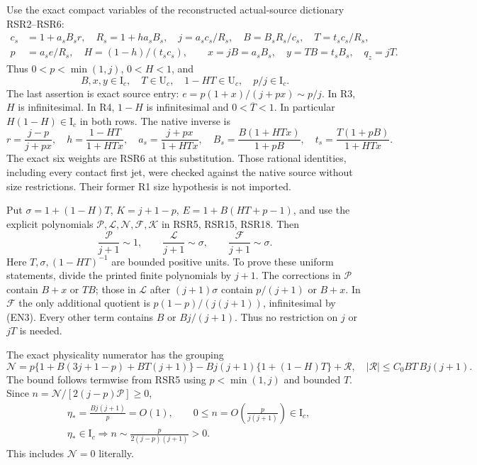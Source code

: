 Use the exact compact variables of the reconstructed actual-source
dictionary RSR2--RSR6:
\[
\begin{aligned}
c_s&=1+a_sB_sr,\quad R_s=1+ha_sB_s,\quad
j=a_sc_s/R_s,\quad B=B_sR_s/c_s,\quad T=t_sc_s/R_s,\\
p&=a_s e/R_s,\quad H=(1-h)/(t_sc_s),\qquad
x=jB=a_sB_s,\quad y=TB=t_sB_s,\quad q_z=jT .
\end{aligned}                                                    \tag{EN2}
\]
Thus $0<p<\min(1,j)$, $0<H<1$, and
\[
B,x,y\in\mathrm I_c,\quad T\in\mathrm U_c,\quad
1-HT\in\mathrm U_c,\quad p/j\in\mathrm I_c.              \tag{EN3}
\]
The last assertion is exact source entry:
$e=p(1+x)/(j+px)\sim p/j$.
In R3, $H$ is infinitesimal. In R4, $1-H$ is infinitesimal
and $0<\overline T<1$. In particular
$H(1-H)\in\mathrm I_c$ in both rows.
The native inverse is
\[
r=\frac{j-p}{j+px},\quad h=\frac{1-HT}{1+HTx},\quad
a_s=\frac{j+px}{1+HTx},\quad
B_s=\frac{B(1+HTx)}{1+pB},\quad
t_s=\frac{T(1+pB)}{1+HTx}.                              \tag{EN4}
\]
The exact six weights are RSR6 at this substitution.
Those rational identities, including every contact first jet, were
checked against the native source without size restrictions. Their
former R1 size hypothesis is not imported.

Put $\sigma=1+(1-H)T$, $K=j+1-p$, $E=1+B(HT+p-1)$, and
use the explicit polynomials $\mathcal P,\mathcal L,\mathcal N,
\mathcal F,\mathcal K$ in RSR5, RSR15, RSR18. Then
\[
\frac{\mathcal P}{j+1}\sim1,\qquad
\frac{\mathcal L}{j+1}\sim\sigma,\qquad
\frac{\mathcal F}{j+1}\sim\sigma.                       \tag{EN5}
\]
Here $T,\sigma,(1-HT)^{-1}$ are bounded positive units.
To prove these uniform statements, divide the printed finite
polynomials by $j+1$. The corrections in $\mathcal P$ contain
$B+x$ or $TB$; those in $\mathcal L$ after
$(j+1)\sigma$ contain $p/(j+1)$ or $B+x$.
In $\mathcal F$ the only additional quotient is
$p(1-p)/(j(j+1))$, infinitesimal by (EN3).
Every other term contains $B$ or $Bj/(j+1)$.
Thus no restriction on $j$ or $jT$ is needed.

The exact physicality numerator has the grouping
\[
\mathcal N=p\{1+B(3j+1-p)+BT(j+1)\}
-Bj(j+1)\{1+(1-H)T\}+\mathcal R,\quad
|\mathcal R|\le C_0BT\,Bj(j+1).                         \tag{EN6}
\]
The bound follows termwise from RSR5 using $p<\min(1,j)$ and
bounded $T$. Since $n=\mathcal N/[2(j-p)\mathcal P]\ge0$,
\[
\begin{aligned}
&\eta_*=\frac{Bj(j+1)}p=O(1),\qquad
0\le n=O\!\left(\frac{p}{j(j+1)}\right)\in\mathrm I_c,\\
&\eta_*\in\mathrm I_c\Longrightarrow
n\sim\frac{p}{2(j-p)(j+1)}>0 .
\end{aligned}                                                    \tag{EN7}
\]
This includes $\mathcal N=0$ literally.

